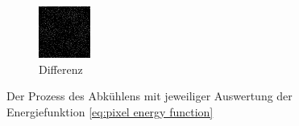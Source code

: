 \begin{figure}[H]
\begin{tcolorbox}[boxrule=4pt,sharp corners=downhill,title=Abkühlen]
\begin{subfigure}[b]{0.2\linewidth}
        \includegraphics[width=\linewidth]{content/simulatedAnnealing/Bilder/Annealing/difference.png}
        \caption{Differenz}
        \label{pic:dither1}
    \end{subfigure}
    \end{tcolorbox}
    \caption{Der Prozess des Abkühlens mit jeweiliger Auswertung der Energiefunktion \ref{eq:pixel energy function}}
    \label{fig:annelaing animated}
\end{figure}

